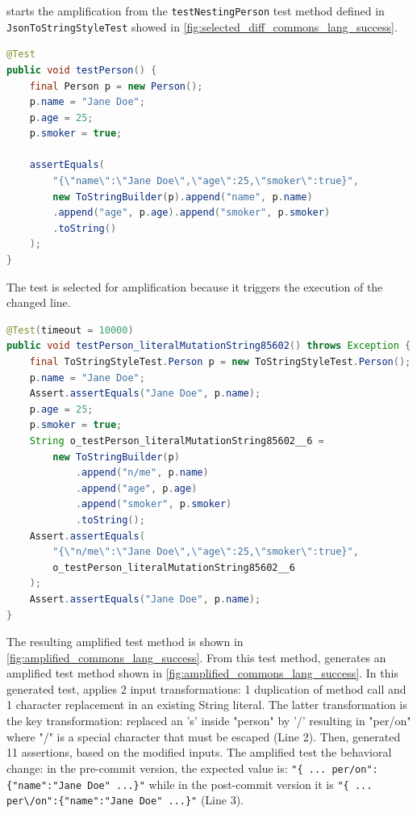 \DCI starts the amplification from the \texttt{testNestingPerson} test method defined in \texttt{JsonToStringStyleTest} showed in \autoref{fig:selected_diff_commons_lang_success}. 

\begin{lstlisting}[float,language=java,caption=Selected test method as a seed to be amplified for commit \textsc{3fadfdd} from commons-lang.,label=fig:selected_diff_commons_lang_success]
@Test
public void testPerson() {
	final Person p = new Person();
	p.name = "Jane Doe";
	p.age = 25;
	p.smoker = true;

	assertEquals(
		"{\"name\":\"Jane Doe\",\"age\":25,\"smoker\":true}",
		new ToStringBuilder(p).append("name", p.name)
		.append("age", p.age).append("smoker", p.smoker)
		.toString()
	);
}
\end{lstlisting}

The test is selected for amplification because it triggers the execution of the changed line.

\begin{lstlisting}[float,language=java,caption=Test generated by DCI that detects the behavioral change of \textsc{3fadfdd} from commons-lang.,label=fig:amplified_commons_lang_success]
@Test(timeout = 10000)
public void testPerson_literalMutationString85602() throws Exception {
	final ToStringStyleTest.Person p = new ToStringStyleTest.Person();
	p.name = "Jane Doe";
	Assert.assertEquals("Jane Doe", p.name);
	p.age = 25;
	p.smoker = true;
	String o_testPerson_literalMutationString85602__6 = 
		new ToStringBuilder(p)
			.append("n/me", p.name)
			.append("age", p.age)
			.append("smoker", p.smoker)
			.toString();
	Assert.assertEquals(
		"{\"n/me\":\"Jane Doe\",\"age\":25,\"smoker\":true}",
		o_testPerson_literalMutationString85602__6
	);
	Assert.assertEquals("Jane Doe", p.name);
}
\end{lstlisting}

The resulting amplified test method is shown in \autoref{fig:amplified_commons_lang_success}.
From this test method, \DCI generates an amplified test method shown in \autoref{fig:amplified_commons_lang_success}. 
In this generated test, \sbampl applies 2 input transformations: 1 duplication of method call and 1 character replacement in an existing String literal.
The latter transformation is the key transformation: \DCI replaced an 's' inside "person" by '/' resulting in "per/on" where "/" is a special character that must be escaped (Line 2). 
Then, \DCI generated 11 assertions, based on the modified inputs. 
The amplified test the behavioral change:
in the pre-commit version, the expected value is: \texttt{"\{ ... per/on":\{"name":"Jane Doe" ...\}"} while in the post-commit version it is \texttt{"\{ ... per\textbackslash/on":\{"name":"Jane Doe" ...\}"} (Line 3).
 

